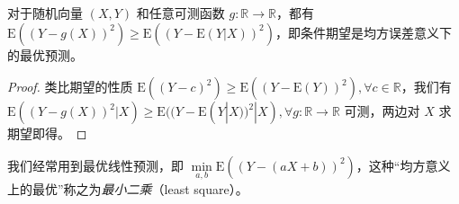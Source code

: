 \documentclass[../main.tex]{subfiles}
\begin{document}
\begin{theorem}\label{thm:4.7.2}
对于随机向量 $(X,Y)$ 和任意可测函数 $g:\mathbb R\rightarrow\mathbb R$，都有 $\mathrm E((Y-g(X))^2)\geq \mathrm E((Y-\mathrm E(Y|X))^2)$，即条件期望是均方误差意义下的最优预测。
\end{theorem}

\begin{proof}
类比期望的性质 $\mathrm E((Y-c)^2)\geq\mathrm E((Y-\mathrm E(Y))^2),\forall c\in\mathbb R$，我们有 $\mathrm E((Y-g(X))^2|X)\geq\mathrm E((Y-\mathrm E(Y|X))^2|X),\forall g:\mathbb R\rightarrow\mathbb R$ 可测，两边对 $X$ 求期望即得。
\end{proof}

我们经常用到最优线性预测，即 $\min\limits_{a,b}\mathrm E((Y-(aX+b))^2)$，这种“均方意义上的最优”称之为\emph{最小二乘}（least square）。

\end{document}
